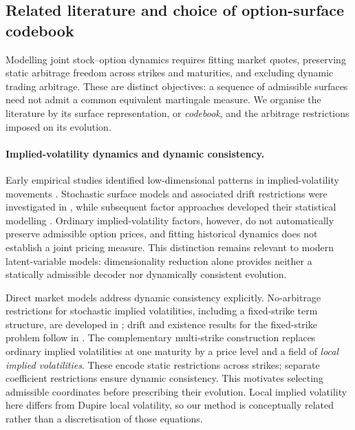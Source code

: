 \subsection*{Related literature and choice of option-surface codebook}

Modelling joint stock--option dynamics requires fitting market quotes, preserving static arbitrage freedom across strikes and maturities, and excluding dynamic trading arbitrage. These are distinct objectives: a sequence of admissible surfaces need not admit a common equivalent martingale measure. We organise the literature by its surface representation, or \emph{codebook}, and the arbitrage restrictions imposed on its evolution.

\paragraph{Implied-volatility dynamics and dynamic consistency.}
Early empirical studies identified low-dimensional patterns in implied-volatility movements \cite{skiadopoulos,contfonseca,fengler2003}. Stochastic surface models and associated drift restrictions were investigated in \cite{cont2002}, while subsequent factor approaches developed their statistical modelling \cite{hafner,fengler2007}. Ordinary implied-volatility factors, however, do not automatically preserve admissible option prices, and fitting historical dynamics does not establish a joint pricing measure. This distinction remains relevant to modern latent-variable models: dimensionality reduction alone provides neither a statically admissible decoder nor dynamically consistent evolution.

Direct market models address dynamic consistency explicitly. No-arbitrage restrictions for stochastic implied volatilities, including a fixed-strike term structure, are developed in \cite{schonbucher}; drift and existence results for the fixed-strike problem follow in \cite{wisselterm}. The complementary multi-strike construction \cite{wisselmulti} replaces ordinary implied volatilities at one maturity by a price level and a field of \emph{local implied volatilities}. These encode static restrictions across strikes; separate coefficient restrictions ensure dynamic consistency. This motivates selecting admissible coordinates before prescribing their evolution. Local implied volatility here differs from Dupire local volatility, so our method is conceptually related rather than a discretisation of those equations.

